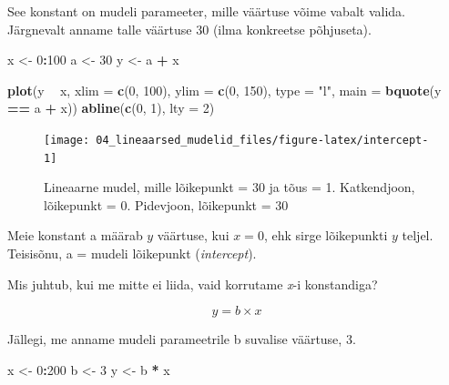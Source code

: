 \documentclass[]{book}
\newenvironment{Shaded}{\begin{snugshade}}{\end{snugshade}}
\newcommand{\DataTypeTok}[1]{\textcolor[rgb]{0.13,0.29,0.53}{#1}}
\newcommand{\DecValTok}[1]{\textcolor[rgb]{0.00,0.00,0.81}{#1}}
\newcommand{\KeywordTok}[1]{\textcolor[rgb]{0.13,0.29,0.53}{\textbf{#1}}}
\newcommand{\NormalTok}[1]{#1}
\newcommand{\OperatorTok}[1]{\textcolor[rgb]{0.81,0.36,0.00}{\textbf{#1}}}
\newcommand{\StringTok}[1]{\textcolor[rgb]{0.31,0.60,0.02}{#1}}
\begin{document}
See konstant on mudeli parameeter, mille väärtuse võime vabalt valida. Järgnevalt anname talle väärtuse 30 (ilma konkreetse põhjuseta).

\begin{Shaded}
\begin{Highlighting}[]
\NormalTok{x <-}\StringTok{ }\DecValTok{0}\OperatorTok{:}\DecValTok{100} 
\NormalTok{a <-}\StringTok{ }\DecValTok{30}
\NormalTok{y <-}\StringTok{ }\NormalTok{a }\OperatorTok{+}\StringTok{ }\NormalTok{x}
\end{Highlighting}
\end{Shaded}



\begin{Shaded}
\begin{Highlighting}[]
\KeywordTok{plot}\NormalTok{(y }\OperatorTok{~}\StringTok{ }\NormalTok{x, }\DataTypeTok{xlim =} \KeywordTok{c}\NormalTok{(}\DecValTok{0}\NormalTok{, }\DecValTok{100}\NormalTok{), }\DataTypeTok{ylim =} \KeywordTok{c}\NormalTok{(}\DecValTok{0}\NormalTok{, }\DecValTok{150}\NormalTok{), }\DataTypeTok{type =} \StringTok{"l"}\NormalTok{,}
     \DataTypeTok{main =} \KeywordTok{bquote}\NormalTok{(y }\OperatorTok{==}\StringTok{ }\NormalTok{a }\OperatorTok{+}\StringTok{ }\NormalTok{x))}
\KeywordTok{abline}\NormalTok{(}\KeywordTok{c}\NormalTok{(}\DecValTok{0}\NormalTok{, }\DecValTok{1}\NormalTok{), }\DataTypeTok{lty =} \DecValTok{2}\NormalTok{)}
\end{Highlighting}
\end{Shaded}

\begin{figure}

{\centering \texttt{[image: 04\_lineaarsed\_mudelid\_files/figure-latex/intercept-1]} 

}

\caption{Lineaarne mudel, mille lõikepunkt = 30 ja tõus = 1. Katkendjoon, lõikepunkt = 0. Pidevjoon, lõikepunkt = 30}\label{fig:intercept}
\end{figure}

Meie konstant a määrab \(y\) väärtuse, kui \(x = 0\), ehk sirge lõikepunkti \(y\) teljel.
Teisisõnu, a = mudeli lõikepunkt (\emph{intercept}).

Mis juhtub, kui me mitte ei liida, vaid korrutame \emph{x}-i konstandiga?

\[y =  b \times x\]

Jällegi, me anname mudeli parameetrile b suvalise väärtuse, 3.

\begin{Shaded}
\begin{Highlighting}[]
\NormalTok{x <-}\StringTok{ }\DecValTok{0}\OperatorTok{:}\DecValTok{200}
\NormalTok{b <-}\StringTok{ }\DecValTok{3}
\NormalTok{y <-}\StringTok{ }\NormalTok{b }\OperatorTok{*}\StringTok{ }\NormalTok{x}
\end{Highlighting}
\end{Shaded}
\end{document}
